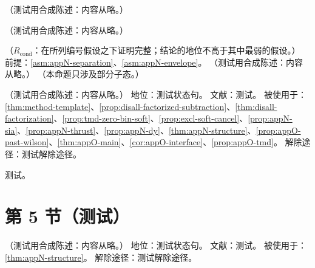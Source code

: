 \begin{remark}\label{rem:appN-abs-edge}
（测试用合成陈述：内容从略。）
\end{remark}

\begin{remark}[没有适配动量分配时]\label{rem:appN-routing}
（测试用合成陈述：内容从略。）
\end{remark}

\begin{lemma}\label{lem:appN-error-table}
（$R_{\mathrm{cond}}$：在所列编号假设之下证明完整；结论的地位不高于其中最弱的假设。）
前提：\cref{asm:appN-separation}、\cref{asm:appN-envelope}。
（测试用合成陈述：内容从略。）
（本命题只涉及部分子态。）
\end{lemma}

\begin{assumption}\label{asm:appN-ward-product}
（测试用合成陈述：内容从略。）
地位：测试状态句。
文献：测试。
被使用于：\cref{thm:method-template}、\cref{prop:disall-factorized-subtraction}、\cref{thm:disall-factorization}、\cref{prop:tmd-zero-bin-soft}、\cref{prop:excl-soft-cancel}、\cref{prop:appN-sia}、\cref{prop:appN-thrust}、\cref{prop:appN-dy}、\cref{thm:appN-structure}、\cref{prop:appO-past-wilson}、\cref{thm:appO-main}、\cref{cor:appO-interface}、\cref{prop:appO-tmd}。
解除途径：测试解除途径。
\end{assumption}
\begin{proofsketch}测试。\end{proofsketch}

\section{第 5 节（测试）}\label{sec:appN-processes}

\begin{assumption}\label{asm:appN-brst-nonlocal}
（测试用合成陈述：内容从略。）
地位：测试状态句。
文献：测试。
被使用于：\cref{thm:appN-structure}。
解除途径：测试解除途径。
\end{assumption}

